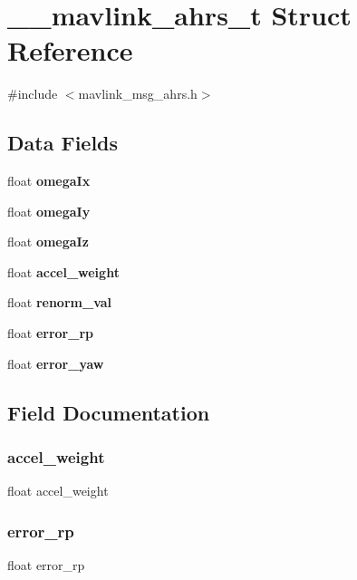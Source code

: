 \section{\+\_\+\+\_\+mavlink\+\_\+ahrs\+\_\+t Struct Reference}
\label{struct____mavlink__ahrs__t}


{\ttfamily \#include $<$mavlink\+\_\+msg\+\_\+ahrs.\+h$>$}

\subsection*{Data Fields}
\begin{DoxyCompactItemize}
\item 
float \textbf{ omega\+Ix}
\item 
float \textbf{ omega\+Iy}
\item 
float \textbf{ omega\+Iz}
\item 
float \textbf{ accel\+\_\+weight}
\item 
float \textbf{ renorm\+\_\+val}
\item 
float \textbf{ error\+\_\+rp}
\item 
float \textbf{ error\+\_\+yaw}
\end{DoxyCompactItemize}


\subsection{Field Documentation}
\mbox{\label{struct____mavlink__ahrs__t_a8b19b3b8b99b35eceb34d9a6e7b97d9c}} 
\subsubsection{accel\+\_\+weight}
{\footnotesize\ttfamily float accel\+\_\+weight}

\mbox{\label{struct____mavlink__ahrs__t_a7911e979ed07c32cf78e0570dee2b663}} 
\subsubsection{error\+\_\+rp}
{\footnotesize\ttfamily float error\+\_\+rp}


